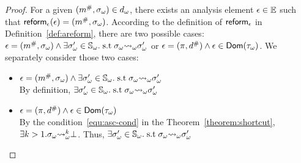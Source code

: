\begin{proof}
  For a given $({m}^{\#}, {\sigma}_\omega) \in {{d}_\omega}$, there exists an analysis
  element $\epsilon \in \mathbb{E}$ such that $\textsf{reform}_\epsilon(\epsilon) = ({m}^{\#},
  {\sigma}_\omega)$.  According to the definition of $\textsf{reform}_\epsilon$ in
  Definition~\ref{def:areform}, there are two possible cases: $\epsilon =
  ({m}^{\#}, {\sigma}_\omega) \wedge \exists {\sigma}_\omega' \in {\mathbb{S}}_\omega. \; \text{s.t} \;
  {\sigma}_\omega {\leadsto}_\omega {\sigma}_\omega'$ or $\epsilon = (\pi, {d}^{\#}) \wedge \epsilon \in
  \textsf{Dom}({\tau}_\omega)$. We separately consider those two cases:
  \begin{itemize}
    \item $\epsilon = ({m}^{\#}, {\sigma}_\omega) \wedge \exists {\sigma}_\omega' \in {\mathbb{S}}_\omega.
      \; \text{s.t} \; {\sigma}_\omega {\leadsto}_\omega {\sigma}_\omega'$\\
        By definition, $\exists {\sigma}_\omega' \in {\mathbb{S}}_\omega.  \; \text{s.t} \;
        {\sigma}_\omega {\leadsto}_\omega {\sigma}_\omega'$
    \item $\epsilon = (\pi, {d}^{\#}) \wedge \epsilon \in \textsf{Dom}({\tau}_\omega)$\\
      By the condition~\ref{equ:asc-cond} in the Theorem~\ref{theorem:shortcut},\\
      $\exists k > 1. {\sigma}_\omega {\leadsto}_\omega^k \bot$.  Thus, $\exists {\sigma}_\omega' \in
      {\mathbb{S}}_\omega.  \; \text{s.t} \; {\sigma}_\omega {\leadsto}_\omega {\sigma}_\omega'$
  \end{itemize}
\end{proof}


